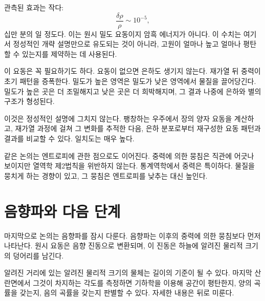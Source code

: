 \begin{classroomqa}
\end{classroomqa}

관측된 효과는 작다:
\begin{equation}
\frac{\delta\rho}{\rho}\sim 10^{-5},
\end{equation}
십만 분의 일 정도다. 이는 원시 밀도 요동이지 암흑 에너지가 아니다. 이 수치는 여기서 정성적인 개략 설명만으로 유도되는 것이 아니라, 고원이 얼마나 높고 얼마나 평탄할 수 있는지를 제약하는 데 사용된다.

이 요동은 꼭 필요하기도 하다. 요동이 없으면 은하도 생기지 않는다. 재가열 뒤 중력이 초기 패턴을 증폭한다. 밀도가 높은 영역은 밀도가 낮은 영역에서 물질을 끌어당긴다. 밀도가 높은 곳은 더 조밀해지고 낮은 곳은 더 희박해지며, 그 결과 나중에 은하와 별의 구조가 형성된다.

이것은 정성적인 설명에 그치지 않는다. 팽창하는 우주에서 장의 양자 요동을 계산하고, 재가열 과정에 걸쳐 그 변화를 추적한 다음, 은하 분포로부터 재구성한 요동 패턴과 결과를 비교할 수 있다. 일치도는 매우 높다.

같은 논의는 엔트로피에 관한 점으로도 이어진다. 중력에 의한 뭉침은 직관에 어긋나 보이지만 열역학 제2법칙을 위반하지 않는다. 통계역학에서 중력은 특이하다. 물질을 뭉치게 하는 경향이 있고, 그 뭉침은 엔트로피를 낮추는 대신 높인다.

\begin{classroomqa}
\end{classroomqa}

\section{음향파와 다음 단계}

마지막으로 논의는 음향파를 잠시 다룬다. 음향파는 이후의 중력에 의한 뭉침보다 먼저 나타난다. 원시 요동은 음향 진동으로 변환되며, 이 진동은 하늘에 알려진 물리적 크기의 덩어리를 남긴다.

알려진 거리에 있는 알려진 물리적 크기의 물체는 길이의 기준이 될 수 있다. 마지막 산란면에서 그것이 차지하는 각도를 측정하면 기하학을 이용해 공간이 평탄한지, 양의 곡률을 갖는지, 음의 곡률을 갖는지 판별할 수 있다. 자세한 내용은 뒤로 미룬다.

\begin{classroomqa}
\end{classroomqa}